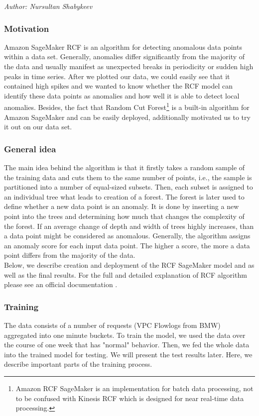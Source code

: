     \textit{Author: Nursultan Shabykeev} \\
    \label{sec:rcf_sagemaker}
    \subsubsection{Motivation}
    Amazon SageMaker RCF is an algorithm for detecting anomalous data points within a data set. Generally, anomalies differ significantly from the majority of the data and usually manifest as unexpected breaks in periodicity or sudden high peaks in time series. After we plotted our data, we could easily see that it contained high spikes and we wanted to know whether the RCF model can identify these data points as anomalies and how well it is able to detect local anomalies. Besides, the fact that Random Cut Forest\footnote{Amazon RCF SageMaker is an implementation for batch data processing, not to be confused with Kinesis RCF which is designed for near real-time data processing.} is a built-in algorithm for Amazon SageMaker and can be easily deployed, additionally motivated us to try it out on our data set.
     
    \subsubsection{General idea}
    The main idea behind the algorithm is that it firstly takes a random sample of the training data and cuts them to the same number of points, i.e., the sample is partitioned into a number of equal-sized subsets. Then, each subset is assigned to an individual tree what leads to creation of a forest. The forest is later used to define whether a new data point is an anomaly. It is done by inserting a new point into the trees and determining how much that changes the complexity of the forest. If an average change of depth and width of trees highly increases, than a data point might be considered as anomalous. Generally, the algorithm assigns an anomaly score for each input data point. The higher a score, the more a data point differs from the majority of the data.\\
    
    Below, we describe creation and deployment of the RCF SageMaker model and as well as the final results. For the full and detailed explanation of RCF algorithm please see an official documentation \cite{awsRcfSagemaker}.
    
    \subsubsection{Training}
    The data consists of a number of requests (VPC Flowlogs from BMW) aggregated into one minute buckets. To train the model, we used the data over the course of one week that has "normal" behavior.  Then, we fed the whole data into the trained model for testing. We will present the test results later. Here, we describe important parts of the training process.\\
    
